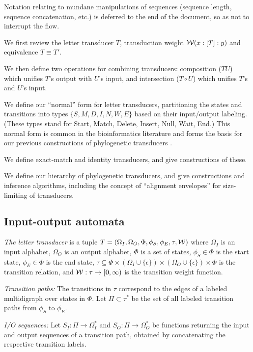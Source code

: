 \documentclass{article}
\newcommand{\seclabel}[1]{\label{sec.#1}}
\newcommand\gappedalphabet[1]{(\Omega_{#1} \cup \{\epsilon\})}
\newcommand\wtrans[4]{#1(#2 : [#3] : #4)}
\newcommand\transequiv{\equiv}
\newcommand\compose{}
\newcommand\fork{\circ}
\newcommand\States{\Phi}
\newcommand\Transitions{\tau}
\newcommand\startstate{\phi_S}
\newcommand\laststate{\phi_E}
\newcommand\weight{{\cal W}}
\begin{document}
Notation relating to mundane manipulations of sequences (sequence length, sequence concatenation, etc.) is deferred to the end of the document,
 so as not to interrupt the flow.

We first review the letter transducer $T$,
 transduction weight $\wtrans{\weight}{x}{T}{y}$ and
 equivalence $T \transequiv T'$.

We then define two operations for combining transducers:
 composition ($T \compose U$) which unifies $T$'s output with $U$'s input,
and
 intersection ($T \fork U$) which unifies $T$'s and $U$'s input.

We define our ``normal'' form for letter transducers,
 partitioning the states and transitions into types $\{S,M,D,I,N,W,E\}$ based on their input/output labeling.
(These types stand for Start, Match, Delete, Insert, Null, Wait, End.)
This normal form is common in the bioinformatics literature \cite{Durbin98}
 and forms the basis for our previous constructions of phylogenetic transducers \cite{Holmes2003,BradleyHolmes2009}.

We define exact-match and identity transducers, and give constructions of these.

We define our hierarchy of phylogenetic transducers, and give constructions and inference algorithms,
including the concept of ``alignment envelopes'' for size-limiting of transducers.

\subsection{Input-output automata}
\seclabel{Transducer}
{\em The letter transducer} is a tuple $T = (\Omega_I, \Omega_O, \States, \startstate, \laststate, \Transitions, \weight)$
where
 $\Omega_I$ is an input alphabet,
 $\Omega_O$ is an output alphabet,
$\States$ is a set of states,
$\startstate \in \States$ is the start state,
$\laststate \in \States$ is the end state,
$\Transitions \subseteq \States \times \gappedalphabet{I} \times \gappedalphabet{O} \times \States$ is the transition relation, and
$\weight:\Transitions \to [0,\infty)$ is the transition weight function.

{\em Transition paths:}
The transitions in $\Transitions$ correspond to the edges of a labeled multidigraph over states in $\States$.
Let $\Pi \subset \Transitions^\ast$ be the set of all labeled transition paths from $\startstate$ to $\laststate$.

{\em I/O sequences:}
Let
$S_I:\Pi \to \Omega_I^\ast$ and
$S_O:\Pi \to \Omega_O^\ast$
be functions returning the input and output sequences of a transition path,
obtained by concatenating the respective transition labels.
\end{document}
